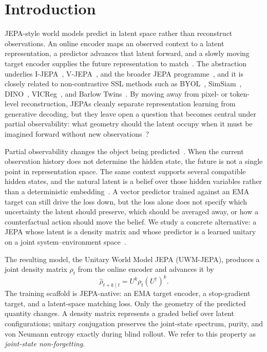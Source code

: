 \section{Introduction}
\label{sec:intro}

JEPA-style world models predict in latent space rather than reconstruct
observations. An online encoder maps an observed context to a latent
representation, a predictor advances that latent forward, and a slowly
moving target encoder supplies the future representation to
match~\cite{grill2020bootstrap,tarvainen2017mean}. The abstraction
underlies I-JEPA~\cite{assran2023ijepa}, V-JEPA~\cite{assran2024vjepa},
and the broader JEPA programme~\cite{lecun2022path}, and it is closely
related to non-contrastive SSL methods such as BYOL~\cite{grill2020bootstrap},
SimSiam~\cite{chen2021exploring}, DINO~\cite{caron2021emerging},
VICReg~\cite{bardes2022vicreg}, and Barlow Twins~\cite{zbontar2021barlow}.
By moving away from pixel- or token-level reconstruction, JEPAs cleanly
separate representation learning from generative decoding, but they
leave open a question that becomes central under partial observability:
what geometry should the latent occupy when it must be imagined forward
without new observations~\cite{ha2018world,hafner2020dream,hafner2020dreamerv2,hafner2023dreamerv3}?

Partial observability changes the object being
predicted~\cite{kaelbling1998planning}. When the current observation
history does not determine the hidden state, the future is not a single
point in representation space. The same context supports several
compatible hidden states, and the natural latent is a belief over those
hidden variables rather than a deterministic
embedding~\cite{kaelbling1998planning,hausknecht2015drqn,igl2018deep,karkus2017qmdp}.
A vector predictor trained against an EMA target can still drive the
loss down, but the loss alone does not specify which uncertainty the
latent should preserve, which should be averaged away, or how a
counterfactual action should move the belief. We study a concrete
alternative: a JEPA whose latent is a density matrix and whose
predictor is a learned unitary on a joint system--environment
space~\cite{nielsen2010quantum,breuer2002theory,stinespring1955positive}.

The resulting model, the Unitary World Model JEPA (UWM-JEPA),
produces a joint density matrix $\rho_t$ from the online encoder and
advances it by
\begin{equation}
  \hat\rho_{t+k\mid t}
  =
  U^k \rho_t (U^\dagger)^k .
\end{equation}
The training scaffold is JEPA-native: an EMA target encoder, a
stop-gradient target, and a latent-space matching loss. Only the
geometry of the predicted quantity changes. A density matrix represents
a graded belief over latent configurations; unitary conjugation
preserves the joint-state spectrum, purity, and von Neumann entropy
exactly during blind rollout. We refer to this property as
\emph{joint-state non-forgetting}.

